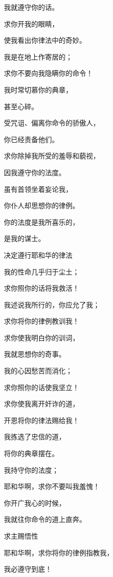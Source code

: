 {\par }{\Q 我就遵守你的话。
\par }{\Q {}求你开我的眼睛，
\par }{\Q 使我看出你律法中的奇妙。
\par }{\Q {}我是在地上作寄居的；
\par }{\Q 求你不要向我隐瞒你的命令！
\par }{\Q {}我时常切慕你的典章，
\par }{\Q 甚至心碎。
\par }{\Q {}受咒诅、偏离你命令的骄傲人，
\par }{\Q 你已经责备他们。
\par }{\Q {}求你除掉我所受的羞辱和藐视，
\par }{\Q 因我遵守你的法度。
\par }{\Q {}虽有首领坐着妄论我，
\par }{\Q 你仆人却思想你的律例。
\par }{\Q {}你的法度是我所喜乐的，
\par }{\Q 是我的谋士。
\par }{\SH 决定遵行耶和华的律法
\par }{\Q {}我的性命几乎归于尘土；
\par }{\Q 求你照你的话将我救活！
\par }{\Q {}我述说我所行的，你应允了我；
\par }{\Q 求你将你的律例教训我！
\par }{\Q {}求你使我明白你的训词，
\par }{\Q 我就思想你的奇事。
\par }{\Q {}我的心因愁苦而消化；
\par }{\Q 求你照你的话使我坚立！
\par }{\Q {}求你使我离开奸诈的道，
\par }{\Q 开恩将你的律法赐给我！
\par }{\Q {}我拣选了忠信的道，
\par }{\Q 将你的典章摆在{}。
\par }{\Q {}我持守你的法度；
\par }{\Q 耶和华啊，求你不要叫我羞愧！
\par }{\Q {}你开广我心的时候，
\par }{\Q 我就往你命令的道上直奔。
\par }{\SH 求主赐悟性
\par }{\Q {}耶和华啊，求你将你的律例指教我，
\par }{\Q 我必遵守到底！
}
